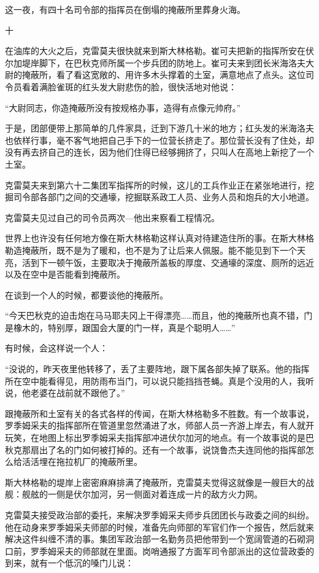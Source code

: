 这一夜，有四十名司令部的指挥员在倒塌的掩蔽所里葬身火海。

十

在油库的大火之后，克雷莫夫很快就来到斯大林格勒。崔可夫把新的指挥所安在伏尔加堤岸脚下，在巴秋克师所属一个步兵团的防地上。崔可夫来到团长米海洛夫大尉的掩蔽所，看了看这宽敞的、用许多木头撑着的土室，满意地点了点头。这位司令员看着满脸雀斑的红头发大尉悲伤的脸，很快活地对他说：

“大尉同志，你造掩蔽所没有按规格办事，造得有点像元帅府。”

于是，团部便带上那简单的几件家具，迁到下游几十米的地方；红头发的米海洛夫也依样行事，毫不客气地把自己手下的一位营长挤走了。那位营长没有了住处，却没有再去挤自己的连长，因为他们住得已经够拥挤了，只叫人在高地上新挖了一个土室。

克雷莫夫来到第六十二集团军指挥所的时候，这儿的工兵作业正在紧张地进行，挖掘司令部各部门之间的交通壕，挖掘联系政工人员、业务人员和炮兵的大小地道。

克雷莫夫见过自己的司令员两次—他出来察看工程情况。

世界上也许没有任何地方像在斯大林格勒这样认真对待建造住所的事。在斯大林格勒造掩蔽所，既不是为了暖和，也不是为了让后来人佩服。能不能见到下一个天亮，活到下一顿午饭，主要取决于掩蔽所盖板的厚度、交通壕的深度、厕所的远近以及在空中是否能看到掩蔽所。

在谈到一个人的时候，都要谈他的掩蔽所。

“今天巴秋克的迫击炮在马马耶夫冈上干得漂亮……而且，他的掩蔽所也真不错，门是橡木的，特别厚，跟国会大厦的门一样，真是个聪明人……”

有时候，会这样说一个人：

“没说的，昨天夜里他转移了，丢了主要阵地，跟下属各部失掉了联系。他的指挥所在空中能看得见，用防雨布当门，可以说只能挡挡苍蝇。真是个没用的人，我听说，他老婆在战前就不跟他了。”

跟掩蔽所和土室有关的各式各样的传闻，在斯大林格勒多不胜数。有一个故事说，罗季姆采夫的指挥部所在管道里忽然涌进了水，师部人员一齐游上岸去，有人就开玩笑，在地图上标出罗季姆采夫指挥部冲进伏尔加河的地点。有一个故事说的是巴秋克那扇出了名的门如何被打掉的。还有一个故事，说饶鲁杰夫连同他的指挥部怎么给活活埋在拖拉机厂的掩蔽所里。

斯大林格勒的堤岸上密密麻麻排满了掩蔽所，克雷莫夫觉得这就像是一艘巨大的战舰：舰舷的一侧是伏尔加河，另一侧面对着连成一片的敌方火力网。

克雷莫夫接受政治部的委托，来解决罗季姆采夫师步兵团团长与政委之间的纠纷。他在动身来罗季姆采夫师部的时候，准备先向师部的军官们作一个报告，然后就来解决这件纠缠不清的事。集团军政治部一名勤务员把他带到一个宽阔管道的石砌洞口前，罗季姆采夫的师部就在里面。岗哨通报了方面军司令部派出的这位营政委的到来，就有一个低沉的嗓门儿说：

